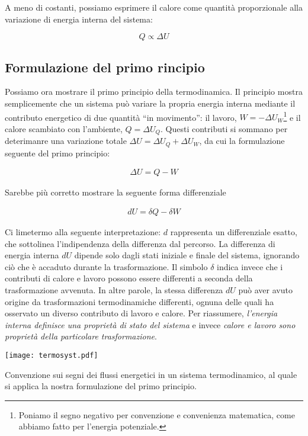 \noindent A meno di costanti, possiamo esprimere il calore come quantità
proporzionale alla variazione di energia interna del sistema:

\[ Q \propto \Delta U \]

\subsection{Formulazione del primo rincipio}
Possiamo ora mostrare il primo principio della termodinamica. Il principio
mostra semplicemente che un sistema può variare la propria energia interna
mediante il contributo energetico di due quantità ``in movimento'': il lavoro,
$W = -\Delta U_W$\footnote{Poniamo il segno negativo per convenzione e convenienza matematica, come abbiamo fatto per l'energia potenziale.}
e il calore scambiato con l'ambiente, $Q = \Delta U_Q$. Questi contributi si sommano per deterimanre una
variazione totale $\Delta U = \Delta U_Q  + \Delta U_W$, da cui la formulazione
seguente del primo principio:

\begin{align}
    \Delta U = Q - W\label{firstprincip}
\end{align}

\noindent Sarebbe più corretto mostrare la seguente forma differenziale

\begin{tcolorbox}[colback = red!30, colframe = red!30!black, title = {Primo principio della termodinamica}]
\begin{align}
    dU = \delta Q - \delta W
\end{align}
\end{tcolorbox}

\noindent Ci limetermo alla seguente interpretazione: $d$ rappresenta
un differenziale esatto, che sottolinea l'indipendenza della differenza
dal percorso. La differenza di energia interna $dU$ dipende solo dagli
stati iniziale e finale del sistema, ignorando ciò che è accaduto durante la
trasformazione.
Il simbolo $\delta$ indica invece che i contributi di calore e lavoro
possono essere differenti a seconda della trasformazione
avvenuta. In altre parole, la stessa differenza $dU$ può aver
avuto origine da trasformazioni termodinamiche differenti, ognuna
delle quali ha osservato un diverso contributo di lavoro e calore.
Per riassumere, \textit{l'energia interna definisce una proprietà
di stato del sistema} e invece \textit{calore e lavoro sono proprietà
della particolare trasformazione}.

\begin{marginfigure}
    \centering
    \texttt{[image: termosyst.pdf]}
    \caption{Convenzione sui segni dei flussi energetici in un
    sistema termodinamico, al quale si applica la nostra
    formulazione del primo principio.}\label{fluxi}
\end{marginfigure}

